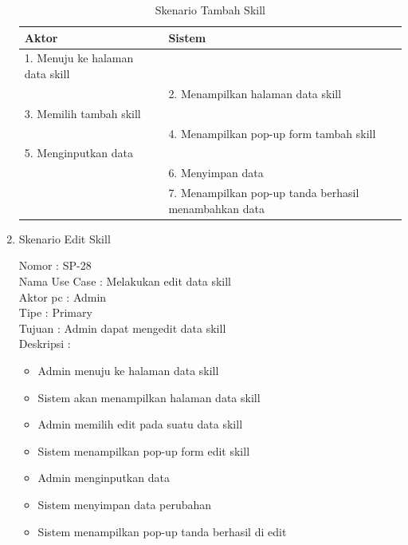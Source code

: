 \begin{enumerate}
\begin{table}
	\caption{Skenario Tambah Skill}
	\centering
	\begin{tabular}{ | l | p{73.5mm} |}
		\hline 
		\textbf{Aktor} & \textbf{Sistem} \\
		\hline
		
		1.	Menuju ke halaman data skill &  \\
		
		\hline
		
		&  2.	Menampilkan halaman data skill \\
		
		\hline
		
		3. Memilih tambah skill & \\
		
		\hline
		
		& 4.	Menampilkan pop-up form tambah skill \\
		
		\hline
		
		5.	Menginputkan data  & \\
		\hline
		
		& 6.	Menyimpan data \\
		\hline
		
		& 7.	Menampilkan pop-up tanda berhasil menambahkan data \\
		\hline
		
	\end{tabular}
\end{table}

\item Skenario Edit Skill

Nomor \kern 3.6pc : SP-28 \\
Nama Use Case : Melakukan edit data skill \\
Aktor  pc : Admin \\
Tipe \kern 4.6pc : Primary \\
Tujuan \kern 3.6pc : Admin dapat mengedit data skill \\
Deskripsi \kern 2.5pc : 

\begin{itemize}
	\item Admin menuju ke halaman data skill
	\item Sistem akan menampilkan halaman data skill
	\item Admin memilih edit pada suatu data skill
	\item Sistem menampilkan pop-up form edit skill
	\item Admin menginputkan data
	\item Sistem menyimpan data perubahan
	\item Sistem menampilkan pop-up tanda berhasil di edit
	

\end{itemize}
\end{enumerate}
